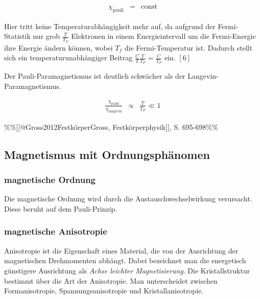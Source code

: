 \documentclass[12pt,a4paper]{scrartcl}
\numberwithin{equation}{section} %
\renewcommand{\[}{} %
\renewcommand{\]}{\noindent} %
\begin{document}
\[
\begin{eqnarray}
    \chi_\mathrm{pauli} &=& \mathrm{const}
\end{eqnarray}
\]

Hier tritt keine Temperaturabhängigkeit mehr auf, da aufgrund der
Fermi-Statistik nur grob \(\frac{T}{T_F}\) Elektronen in einem
Energieintervall um die Fermi-Energie ihre Energie ändern können, wobei
\(T_{f}\) die Fermi-Temperatur ist. Dadurch stellt sich ein
temperaturunabhängiger Beitrag
\(\frac{C}{T} \frac{T}{T_F} = \frac{C}{T_F}\) ein. \([6]\)

Der Pauli-Paramagnetismus ist deutlich schwächer als der
Langevin-Paramagnetismus.

\[
\begin{eqnarray}
    \frac{\chi_\mathrm{pauli}}{\chi_\mathrm{langevin}}
        &\propto& \frac{T}{T_F} \ll 1
\end{eqnarray}
\]

\%\%{[}{[}@Gross2012Festkörper\textbar Gross, Festkörperphysik{]}{]}, S.
695-698\%\%

\hypertarget{magnetismus-mit-ordnungsphuxe4nomen}{%
\subsection{Magnetismus mit
Ordnungsphänomen}\label{magnetismus-mit-ordnungsphuxe4nomen}}

\hypertarget{magnetische-ordnung}{%
\subsubsection{magnetische Ordnung}\label{magnetische-ordnung}}

Die magnetische Ordnung wird durch die Austauschwechselwirkung
verursacht. Diese beruht auf dem Pauli-Prinzip.

\hypertarget{magnetische-anisotropie}{%
\subsubsection{magnetische Anisotropie}\label{magnetische-anisotropie}}

Anisotropie ist die Eigenschaft eines Material, die von der Ausrichtung
der magnetischen Drehmomenten abhängt. Dabei bezeichnet man die
energetisch günstigere Ausrichtung als \emph{Achse leichter
Magnetisierung}. Die Kristallstruktur bestimmt über die Art der
Anisotropie. Man unterscheidet zwischen Formanisotropie,
Spannungsanisotropie und Kristallanisotropie.
\end{document}
